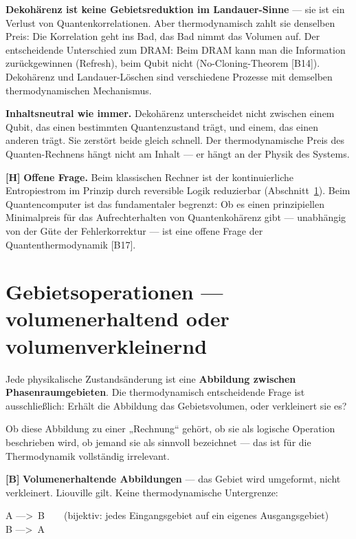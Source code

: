 \textbf{Dekohärenz ist keine Gebietsreduktion im Landauer-Sinne} --- sie ist ein
Verlust von Quantenkorrelationen. Aber thermodynamisch zahlt sie denselben Preis:
Die Korrelation geht ins Bad, das Bad nimmt das Volumen auf. Der entscheidende
Unterschied zum DRAM: Beim DRAM kann man die Information zurückgewinnen
(Refresh), beim Qubit nicht (No-Cloning-Theorem [B14]). Dekohärenz und
Landauer-Löschen sind verschiedene Prozesse mit demselben thermodynamischen
Mechanismus.

\textbf{Inhaltsneutral wie immer.} Dekohärenz unterscheidet nicht zwischen einem
Qubit, das einen bestimmten Quantenzustand trägt, und einem, das einen anderen
trägt. Sie zerstört beide gleich schnell. Der thermodynamische Preis des
Quanten-Rechnens hängt nicht am Inhalt --- er hängt an der Physik des Systems.

\textbf{[H]} \textbf{Offene Frage.} Beim klassischen Rechner ist der kontinuierliche
Entropiestrom im Prinzip durch reversible Logik reduzierbar
(Abschnitt~\ref{sec:gebietsop}). Beim Quantencomputer ist das fundamentaler
begrenzt: Ob es einen prinzipiellen Minimalpreis für das Aufrechterhalten von
Quantenkohärenz gibt --- unabhängig von der Güte der Fehlerkorrektur --- ist eine
offene Frage der Quantenthermodynamik [B17].

\section{Gebietsoperationen --- volumenerhaltend oder volumenverkleinernd}
\label{sec:gebietsop}

Jede physikalische Zustandsänderung ist eine \textbf{Abbildung zwischen
Phasenraumgebieten}. Die thermodynamisch entscheidende Frage ist ausschließlich:
Erhält die Abbildung das Gebietsvolumen, oder verkleinert sie es?

Ob diese Abbildung zu einer „Rechnung“ gehört, ob sie als logische Operation
beschrieben wird, ob jemand sie als sinnvoll bezeichnet --- das ist für die
Thermodynamik vollständig irrelevant.

\textbf{[B]} \textbf{Volumenerhaltende Abbildungen} --- das Gebiet wird umgeformt, nicht
verkleinert. Liouville gilt. Keine thermodynamische Untergrenze:

\begin{center}
\begin{minipage}{0.75\textwidth}
\ttfamily\small
A --->\ B\ \ \ \ (bijektiv: jedes Eingangsgebiet auf ein eigenes Ausgangsgebiet)\\
B --->\ A
\end{minipage}
\end{center}

